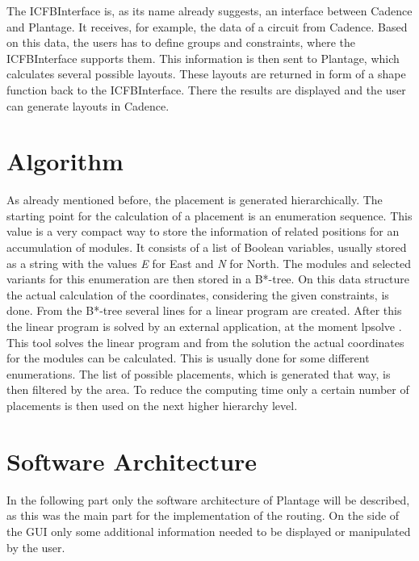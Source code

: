 The ICFBInterface is, as its name already suggests, an interface between Cadence and Plantage. It receives, for example, the data of a circuit from Cadence. Based on this data, the users has to define groups and constraints, where the ICFBInterface supports them. This information is then sent to Plantage, which calculates several possible layouts. These layouts are returned in form of a shape function back to the ICFBInterface. There the results are displayed and the user can generate layouts in Cadence.

\section{Algorithm}
As already mentioned before, the placement is generated hierarchically. The starting point for the calculation of a placement is an enumeration sequence. This value is a very compact way to store the information of related positions for an accumulation of modules. It consists of a list of Boolean variables, usually stored as a string with the values \textit{E} for East and \textit{N} for North. The modules and selected variants for this enumeration are then stored in a B*-tree. On this data structure the actual calculation of the coordinates, considering the given constraints, is done. From the B*-tree several lines for a linear program are created. After this the linear program is solved by an external application, at the moment lp\textunderscore solve \cite{lp_solve}. This tool solves the linear program and from the solution the actual coordinates for the modules can be calculated. This is usually done for some different enumerations. The list of possible placements, which is generated that way, is then filtered by the area. To reduce the computing time only a certain number of placements is then used on the next higher hierarchy level.

\section{Software Architecture}
In the following part only the software architecture of Plantage will be described, as this was the main part for the implementation of the routing. On the side of the GUI only some additional information needed to be displayed or manipulated by the user.

